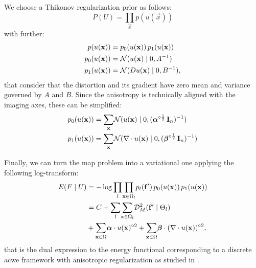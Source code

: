 We choose a Thikonov regularization prior as follows:
\begin{equation*}
P(U) = \underset{\vec{x}}{\prod} p(u(\vec{x}))
\end{equation*}
with further:
\begin{align*}
p(u(\vec{x})) &= p_0(u(\vec{x})) \, p_1(u(\vec{x})) \notag\\
p_0(u(\vec{x})) &= \mathcal{N}( u(\vec{x}) \mid 0, A^{-1}) \notag\\
p_1(u(\vec{x})) &= \mathcal{N}( Du(\vec{x}) \mid 0, B^{-1}),
\end{align*}
that consider that the distortion and its gradient have zero
mean and variance governed by $A$ and $B$. Since the anisotropy
is technically aligned with the imaging axes, these can
be simplified:
\begin{align}
p_0(u(\vec{x})) &= \underset{\vec{x}}{\sum} \mathcal{N}( u(\vec{x}) \mid 0, (\boldsymbol{\alpha}^{\circ\frac12}\,\vec{I}_n)^{-1}) \notag\\
p_1(u(\vec{x})) &= \underset{\vec{x}}{\sum} \mathcal{N}( \nabla \cdot u(\vec{x}) \mid 0, (\boldsymbol{\beta}^{\circ\frac12}\,\vec{I}_n)^{-1})
\label{eq:priors}
\end{align}

Finally, we can turn the \gls{map} problem into 
a variational one
applying the following log-transform:
\begin{align}
E(F \mid U) &= -\log \underset{l}{\prod}
\underset{\vec{x} \in \Omega_l}{\prod} 
p_l( \vec{f}')\,p_0( u(\vec{x}))\,p_1( u(\vec{x})) \notag\\
&= C + \underset{l}{\sum}
\underset{\vec{x} \in \Omega_l}{\sum}
\mdist{f'}{l} \notag\\
&+ \underset{\vec{x} \in \Omega}{\sum} \boldsymbol{\alpha} \cdot u(\vec{x})^{\circ2}
+ \underset{\vec{x} \in \Omega}{\sum} \boldsymbol{\beta} \cdot (\nabla \cdot u(\vec{x}))^{\circ2},
\label{eq:energy}
\end{align}
that is the dual expression to the energy functional corresponding
to a discrete \gls*{acwe} framework \citep{chan_active_2001}
with anisotropic regularization as studied in
\citep{nagel_investigation_1986}.

